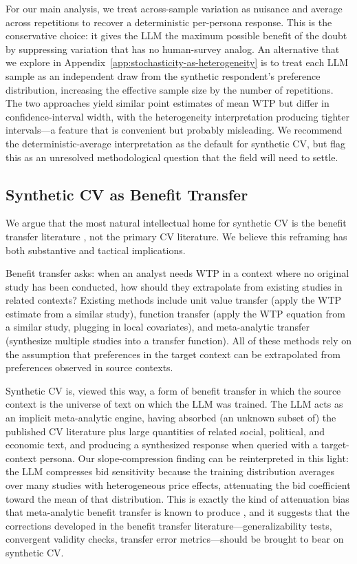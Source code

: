 \documentclass[12pt]{article}
\begin{document}
For our main analysis, we treat across-sample variation as nuisance and average across repetitions to recover a deterministic per-persona response. This is the conservative choice: it gives the LLM the maximum possible benefit of the doubt by suppressing variation that has no human-survey analog. An alternative that we explore in Appendix~\ref{app:stochasticity-as-heterogeneity} is to treat each LLM sample as an independent draw from the synthetic respondent's preference distribution, increasing the effective sample size by the number of repetitions. The two approaches yield similar point estimates of mean WTP but differ in confidence-interval width, with the heterogeneity interpretation producing tighter intervals---a feature that is convenient but probably misleading. We recommend the deterministic-average interpretation as the default for synthetic CV, but flag this as an unresolved methodological question that the field will need to settle.

\subsection{Synthetic CV as Benefit Transfer}\label{sec:disc-benefit-transfer}

We argue that the most natural intellectual home for synthetic CV is the benefit transfer literature \parencite{Rosenberger2017, Loomis2015, Boyle2010}, not the primary CV literature. We believe this reframing has both substantive and tactical implications.

Benefit transfer asks: when an analyst needs WTP in a context where no original study has been conducted, how should they extrapolate from existing studies in related contexts? Existing methods include unit value transfer (apply the WTP estimate from a similar study), function transfer (apply the WTP equation from a similar study, plugging in local covariates), and meta-analytic transfer (synthesize multiple studies into a transfer function). All of these methods rely on the assumption that preferences in the target context can be extrapolated from preferences observed in source contexts.

Synthetic CV is, viewed this way, a form of benefit transfer in which the source context is the universe of text on which the LLM was trained. The LLM acts as an implicit meta-analytic engine, having absorbed (an unknown subset of) the published CV literature plus large quantities of related social, political, and economic text, and producing a synthesized response when queried with a target-context persona. Our slope-compression finding can be reinterpreted in this light: the LLM compresses bid sensitivity because the training distribution averages over many studies with heterogeneous price effects, attenuating the bid coefficient toward the mean of that distribution. This is exactly the kind of attenuation bias that meta-analytic benefit transfer is known to produce \parencite{Bergstrom2008}, and it suggests that the corrections developed in the benefit transfer literature---generalizability tests, convergent validity checks, transfer error metrics---should be brought to bear on synthetic CV.
\end{document}
